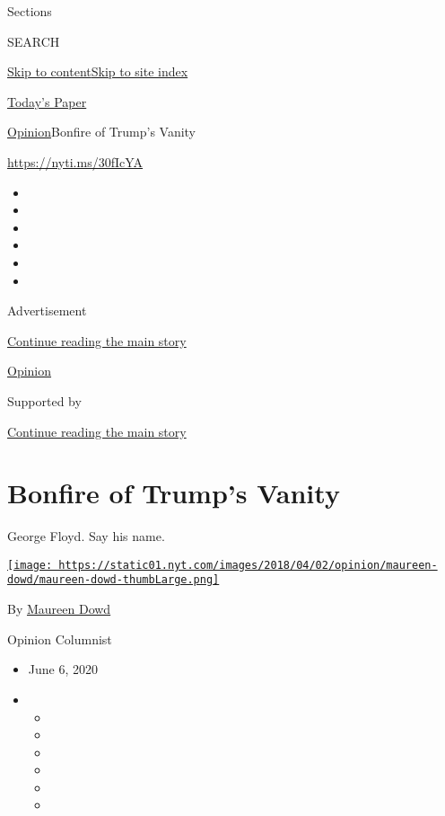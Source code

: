 Sections

SEARCH

\protect\hyperlink{site-content}{Skip to
content}\protect\hyperlink{site-index}{Skip to site index}

\href{https://myaccount.nytimes.com/auth/login?response_type=cookie\&client_id=vi}{}

\href{https://www.nytimes.com/section/todayspaper}{Today's Paper}

\href{/section/opinion}{Opinion}\textbar{}Bonfire of Trump's Vanity

\href{https://nyti.ms/30fIcYA}{https://nyti.ms/30fIcYA}

\begin{itemize}
\item
\item
\item
\item
\item
\item
\end{itemize}

Advertisement

\protect\hyperlink{after-top}{Continue reading the main story}

\href{/section/opinion}{Opinion}

Supported by

\protect\hyperlink{after-sponsor}{Continue reading the main story}

\hypertarget{bonfire-of-trumps-vanity}{%
\section{Bonfire of Trump's Vanity}\label{bonfire-of-trumps-vanity}}

George Floyd. Say his name.

\href{https://www.nytimes.com/by/maureen-dowd}{\texttt{[image: https://static01.nyt.com/images/2018/04/02/opinion/maureen-dowd/maureen-dowd-thumbLarge.png]}}

By \href{https://www.nytimes.com/by/maureen-dowd}{Maureen Dowd}

Opinion Columnist

\begin{itemize}
\item
  June 6, 2020
\item
  \begin{itemize}
  \item
  \item
  \item
  \item
  \item
  \item
  \end{itemize}
\end{itemize}

